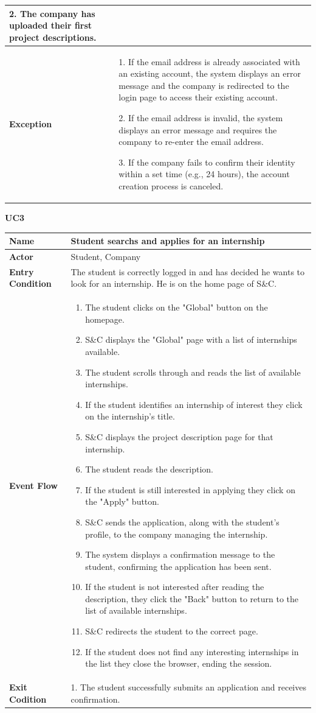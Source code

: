 \begin{longtable}{|p{}|p{}|}
2. The company has uploaded their first project descriptions.\\
\hline
\textbf{Exception} & 
1. If the email address is already associated with an existing account, the system displays an error message and the company is redirected to the login page to access their existing account.	

2. If the email address is invalid, the system displays an error message and requires the company to re-enter the email address.	

3. If the company fails to confirm their identity within a set time (e.g., 24 hours), the account creation process is canceled.\\
\hline
\end{longtable}

\textbf{UC3}

\begin{longtable}{|p{}|p{}|}
\hline
\textbf{Name} &  Student searchs and applies for an internship\\
\hline
\textbf{Actor} &  Student, Company\\
\hline
\textbf{Entry Condition} &  The student is correctly logged in and has decided he wants to look for an internship. He is on the home page of S\&C.\\
\hline
\textbf{Event Flow} &  
\begin{enumerate}
    \item  The student clicks on the "Global" button on the homepage.
    \item S\&C displays the "Global" page with a list of internships available.
    \item The student scrolls through and reads the list of available internships.
    \item If the student identifies an internship of interest they click on the internship's title.
    \item S\&C displays the project description page for that internship.
    \item The student reads the description.
    \item If the student is still interested in applying they click on the "Apply" button.
    \item S\&C sends the application, along with the student's profile, to the company managing the internship.
    \item The system displays a confirmation message to the student, confirming the application has been sent.
    \item If the student is not interested after reading the description, they click the "Back" button to return to the list of available internships.
    \item S\&C redirects the student to the correct page.
    \item  If the student does not find any interesting internships in the list they close the browser, ending the session.
\end{enumerate} \\
\hline
\textbf{Exit Codition} &  
1. The student successfully submits an application and receives confirmation.


\end{longtable}

